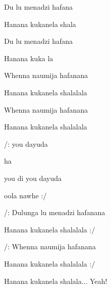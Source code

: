 

\zr

              
\kr

\zs
Du lu menadzi hafana

Hanana kukanela shala

Du lu menadzi hafana

Hanana kuka la
\ks


\zs
Whenna naumija hafanana

Hanana kukanela shalalala

Whenna naumija hafanana

Hanana kukanela shalalala
\ks

\zs
/:   you dayuda

 ha

 you di  you dayuda

 oola nawhe :/ 
\ks

\zr \kr

\zs
/: Dulunga lu menadzi hafanana

Hanana kukanela shalalala :/

/: Whenna naumija hafanana

Hanana kukanela shalalala :/
\ks

\zr \kr


Hanana kukanela shalala... Yeah!

\kp


